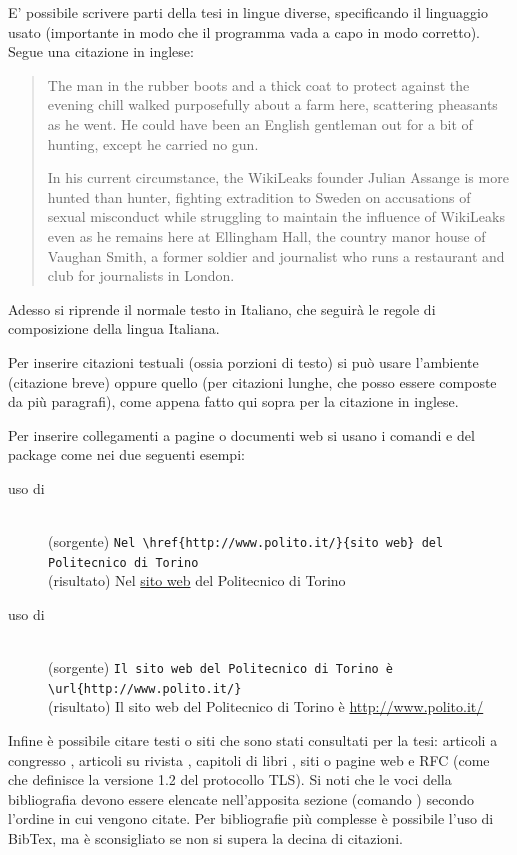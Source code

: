 E' possibile scrivere parti della tesi in lingue diverse, specificando il linguaggio usato (importante in modo che il programma vada a capo in modo corretto). Segue una citazione in inglese:
\begin{quotation}
The man in the rubber boots and a thick coat to protect against the evening chill walked purposefully about a farm here, scattering pheasants as he went. He could have been an English gentleman out for a bit of hunting, except he carried no gun.

In his current circumstance, the WikiLeaks founder Julian Assange is more hunted than hunter, fighting extradition to Sweden on accusations of sexual misconduct while struggling to maintain the influence of WikiLeaks even as he remains here at Ellingham Hall, the country manor house of Vaughan Smith, a former soldier and journalist who runs a restaurant and club for journalists in London. 
\end{quotation}
Adesso si riprende il normale testo in Italiano, che seguirà le regole di composizione della lingua Italiana.

Per inserire citazioni testuali (ossia porzioni di testo) si può usare l'ambiente  (citazione breve) oppure quello  (per citazioni lunghe, che posso essere composte da più paragrafi), come appena fatto qui sopra per la citazione in inglese.

Per inserire collegamenti a pagine o documenti web si usano i comandi  e  del package  come nei due seguenti esempi:
\begin{description}
\item[uso di ]\mbox{}\\
(sorgente) \verb+Nel \href{http://www.polito.it/}{sito web} del Politecnico di Torino+
\\
(risultato) Nel \href{http://www.polito.it/}{sito web} del Politecnico di Torino
\item[uso di ]\mbox{}\\
(sorgente) \verb+Il sito web del Politecnico di Torino è \url{http://www.polito.it/}+
\\
(risultato) Il sito web del Politecnico di Torino è \url{http://www.polito.it/}
\end{description}

Infine è possibile citare testi o siti che sono stati consultati per la tesi: articoli a congresso \cite{psisec},
articoli su rivista \cite{tpa}, capitoli di libri \cite{tc}, siti o pagine web \cite{openssl} e RFC (come  \cite{tls12} che definisce la versione 1.2 del protocollo TLS).
Si noti che le voci della bibliografia devono essere elencate nell'apposita sezione (comando ) secondo l'ordine in cui vengono citate.
Per bibliografie più complesse è possibile l'uso di BibTex, ma è sconsigliato se non si supera la decina di citazioni.


